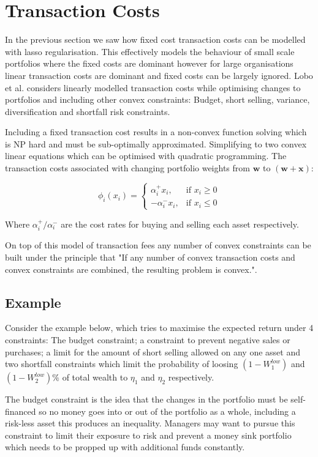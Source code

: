 \documentclass[a4paper,10pt, twocolumn]{article}
\begin{document}
\section{Transaction Costs}
In the previous section we saw how fixed cost transaction costs can be modelled with lasso regularisation. This effectively models the behaviour of small scale portfolios where the fixed costs are dominant however for large organisations linear transaction costs are dominant and fixed costs can be largely ignored. Lobo et al. considers linearly modelled transaction costs while optimising changes to portfolios and including other convex constraints: Budget, short selling, variance, diversification and shortfall risk constraints. 

Including a fixed transaction cost results in a non-convex function solving which is NP hard and must be sub-optimally approximated. Simplifying to two convex linear equations which can be optimised with quadratic programming. The transaction costs associated with changing portfolio weights from $\mathbf{w}$ to $(\mathbf{w + x})$:

\[
    \phi_i(x_i)= 
\begin{cases}
    \alpha_i^+x_i,& \text{if } x_i\geq 0\\
    -\alpha_i^-x_i,              & \text{if } x_i\leq 0
\end{cases}
\]

Where $\alpha_i^+/\alpha_i^-$ are the cost rates for buying and selling each asset respectively. 

On top of this model of transaction fees any number of convex constraints can be built under the principle that "If any number of convex transaction costs and convex constraints are combined, the resulting problem is convex."\cite{Lobo}.

\subsection{Example}
Consider the example below, which tries to maximise the expected return under 4 constraints: The budget constraint; a constraint to prevent negative sales or purchases; a limit for the amount of short selling allowed on any one asset and two shortfall constraints which limit the probability of loosing $(1-W_1^{low})$ and $(1-W_2^{low})\%$ of total wealth to $\eta_1$ and $\eta_2$ respectively.

The budget constraint is the idea that the changes in the portfolio must be self-financed so no money goes into or out of the portfolio as a whole, including a risk-less asset this produces an inequality. Managers may want to pursue this constraint to limit their exposure to risk and prevent a money sink portfolio which needs to be propped up with additional funds constantly. 
\end{document}
